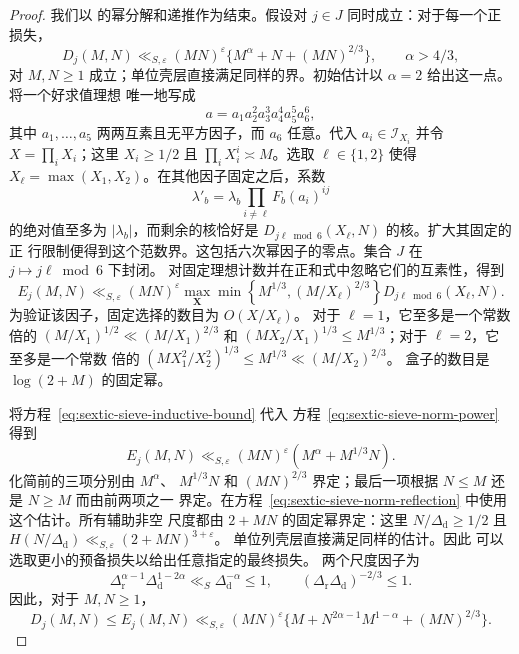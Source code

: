\documentclass[11pt,a4paper]{article}
\numberwithin{equation}{section}
\numberwithin{figure}{section}
\theoremstyle{definition}
\theoremstyle{remark}
\begin{document}
\begin{proof}
我们以 \cite[Lemmas~3.4--3.5]{BGL} 的幂分解和递推作为结束。假设对
$j\in J$ 同时成立：对于每一个正损失，
\begin{equation}\label{eq:sextic-sieve-inductive-bound}
 D_j(M,N)\ll_{S,\varepsilon}(MN)^\varepsilon
       \{M^\alpha+N+(MN)^{2/3}\},\qquad \alpha>4/3,
\end{equation}
对 $M,N\ge1$ 成立；单位壳层直接满足同样的界。初始估计以 $\alpha=2$ 给出这一点。将一个好求值理想
唯一地写成
\[
 a=a_1a_2^2a_3^3a_4^4a_5^5a_6^6,
\]
其中 $a_1,\ldots,a_5$ 两两互素且无平方因子，而 $a_6$ 任意。代入
$a_i\in\mathcal I_{X_i}$ 并令 $X=\prod_iX_i$；这里 $X_i\ge1/2$ 且
$\prod_iX_i^i\asymp M$。选取 $\ell\in\{1,2\}$ 使得
$X_\ell=\max(X_1,X_2)$。在其他因子固定之后，系数
\[
 \lambda'_b=\lambda_b\prod_{i\ne\ell}F_b(a_i)^{ij}
\]
的绝对值至多为 $|\lambda_b|$，而剩余的核恰好是
$D_{j\ell\bmod6}(X_\ell,N)$ 的核。扩大其固定的正
行限制便得到这个范数界。这包括六次幂因子的零点。集合 $J$ 在 $j\mapsto j\ell\bmod6$ 下封闭。
对固定理想计数并在正和式中忽略它们的互素性，得到
\begin{equation}\label{eq:sextic-sieve-norm-power}
 E_j(M,N)\ll_{S,\varepsilon}(MN)^\varepsilon
 \max_{\boldsymbol X}
 \min\left\{M^{1/3},(M/X_\ell)^{2/3}\right\}
             D_{j\ell\bmod6}(X_\ell,N).
\end{equation}
为验证该因子，固定选择的数目为 $O(X/X_\ell)$。
对于 $\ell=1$，它至多是一个常数倍的
$(M/X_1)^{1/2}\ll(M/X_1)^{2/3}$ 和
$(MX_2/X_1)^{1/3}\le M^{1/3}$；对于 $\ell=2$，它至多是一个常数
倍的 $(MX_1^2/X_2^2)^{1/3}\le M^{1/3}\ll(M/X_2)^{2/3}$。
盒子的数目是 $\log(2+M)$ 的固定幂。

将方程~\eqref{eq:sextic-sieve-inductive-bound} 代入
方程~\eqref{eq:sextic-sieve-norm-power} 得到
\[
 E_j(M,N)\ll_{S,\varepsilon}(MN)^\varepsilon
                    (M^\alpha+M^{1/3}N).
\]
化简前的三项分别由 $M^\alpha$、
$M^{1/3}N$ 和 $(MN)^{2/3}$ 界定；最后一项根据 $N\le M$ 还是 $N\ge M$ 而由前两项之一
界定。在方程~\eqref{eq:sextic-sieve-norm-reflection} 中使用这个估计。所有辅助非空
尺度都由 $2+MN$ 的固定幂界定：这里 $N/\Delta_{\mathrm d}\ge1/2$ 且
$H(N/\Delta_{\mathrm d})\ll_{S,\varepsilon}(2+MN)^{3+\varepsilon}$。
单位列壳层直接满足同样的估计。因此
可以选取更小的预备损失以给出任意指定的最终损失。
两个尺度因子为
\[
 \Delta_{\mathrm r}^{\alpha-1}\Delta_{\mathrm d}^{1-2\alpha}
       \ll_S\Delta_{\mathrm d}^{-\alpha}\le1,
 \qquad (\Delta_{\mathrm r}\Delta_{\mathrm d})^{-2/3}\le1.
\]
因此，对于 $M,N\ge1$，
\begin{equation}\label{eq:sextic-sieve-norm-recurrence}
 D_j(M,N)\le E_j(M,N)\ll_{S,\varepsilon}(MN)^\varepsilon
       \{M+N^{2\alpha-1}M^{1-\alpha}+(MN)^{2/3}\}.
\end{equation}


\end{proof}
\end{document}
